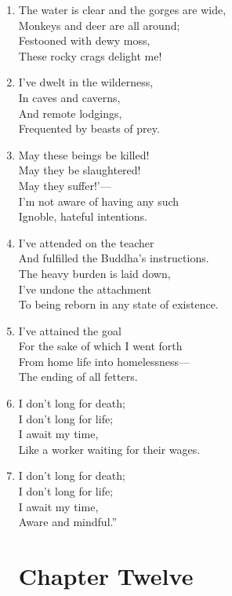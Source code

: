 \documentclass[10pt, openany]{book}
\newcommand*{\vleftofline}[1]{\leavevmode\llap{#1}}
\begin{document}
\begin{enumerate}
\item The water is clear and the gorges are wide,\\
Monkeys and deer are all around;\\
Festooned with dewy moss,\\
These rocky crags delight me!

\item I’ve dwelt in the wilderness,\\
In caves and caverns,\\
And remote lodgings,\\
Frequented by beasts of prey.

\item \vleftofline{‘}May these beings be killed! \\
May they be slaughtered!\\
May they suffer!’—\\
I’m not aware of having any such\\
Ignoble, hateful intentions.

\item I’ve attended on the teacher\\
And fulfilled the Buddha’s instructions.\\
The heavy burden is laid down,\\
I’ve undone the attachment \\
To being reborn in any state of existence.

\item I’ve attained the goal\\
For the sake of which I went forth\\
From home life into homelessness—\\
The ending of all fetters.

\item I don’t long for death;\\
I don’t long for life;\\
I await my time,\\
Like a worker waiting for their wages.

\item I don’t long for death;\\
I don’t long for life;\\
I await my time,\\
Aware and mindful.”

\chapter*{Chapter Twelve}


\end{enumerate}
\end{document}
